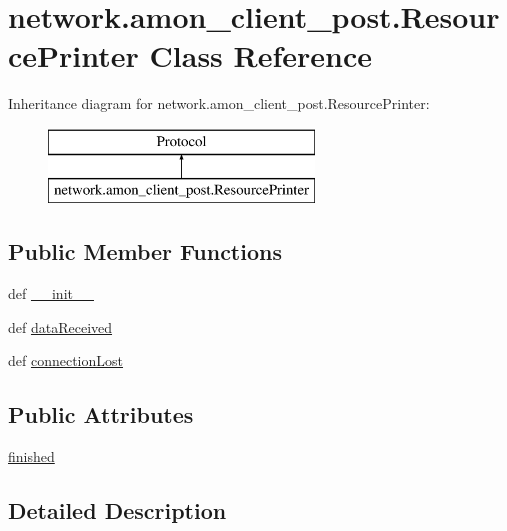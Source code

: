\hypertarget{classnetwork_1_1amon__client__post_1_1_resource_printer}{\section{network.\-amon\-\_\-client\-\_\-post.\-Resource\-Printer Class Reference}
\label{classnetwork_1_1amon__client__post_1_1_resource_printer}
}
Inheritance diagram for network.\-amon\-\_\-client\-\_\-post.\-Resource\-Printer\-:\begin{figure}[H]
\begin{center}
\leavevmode
\includegraphics[height=2.000000cm]{db/d3a/classnetwork_1_1amon__client__post_1_1_resource_printer}
\end{center}
\end{figure}
\subsection*{Public Member Functions}
\begin{DoxyCompactItemize}
\item 
def \hyperlink{classnetwork_1_1amon__client__post_1_1_resource_printer_a3e2fdf686dbe44f9c23b8a4dffa56eeb}{\-\_\-\-\_\-init\-\_\-\-\_\-}
\item 
def \hyperlink{classnetwork_1_1amon__client__post_1_1_resource_printer_a14fbf073b34272478d4b8227ddd4bbc1}{data\-Received}
\item 
def \hyperlink{classnetwork_1_1amon__client__post_1_1_resource_printer_a8d658a91c195781cb1665ea0f4ce423f}{connection\-Lost}
\end{DoxyCompactItemize}
\subsection*{Public Attributes}
\begin{DoxyCompactItemize}
\item 
\hyperlink{classnetwork_1_1amon__client__post_1_1_resource_printer_a56fa727823bc165a6a851645a652170c}{finished}
\end{DoxyCompactItemize}


\subsection{Detailed Description}



